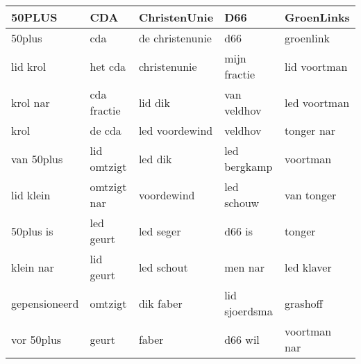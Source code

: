 \begin{tabular}{lllll}
\toprule
        50PLUS &          CDA &     ChristenUnie &            D66 &    GroenLinks \\
\midrule
        50plus &          cda &  de christenunie &            d66 &     groenlink \\
      lid krol &      het cda &     christenunie &   mijn fractie &  lid voortman \\
      krol nar &  cda fractie &          lid dik &    van veldhov &  led voortman \\
          krol &       de cda &   led voordewind &        veldhov &    tonger nar \\
    van 50plus &  lid omtzigt &          led dik &   led bergkamp &      voortman \\
     lid klein &  omtzigt nar &       voordewind &     led schouw &    van tonger \\
     50plus is &    led geurt &        led seger &         d66 is &        tonger \\
     klein nar &    lid geurt &       led schout &        men nar &    led klaver \\
 gepensioneerd &      omtzigt &        dik faber &  lid sjoerdsma &      grashoff \\
    vor 50plus &        geurt &            faber &        d66 wil &  voortman nar \\
\bottomrule
\end{tabular}
